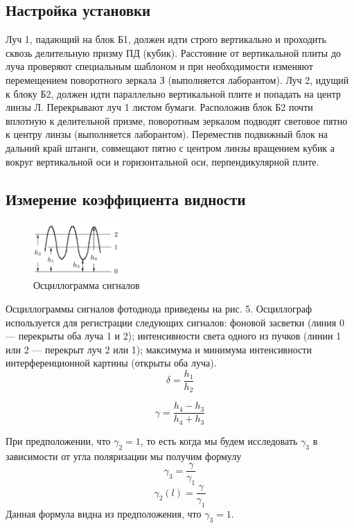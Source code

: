 \documentclass[a4paper, 12pt]{article}%
\begin{document}
\subsection*{Настройка установки}
Луч 1, падающий на блок Б1, должен идти строго вертикально и проходить сквозь делительную призму ПД (кубик). Расстояние от вертикальной плиты до луча проверяют специальным шаблоном и при необходимости изменяют перемещением поворотного зеркала З (выполняется лаборантом). Луч 2, идущий к блоку Б2, должен идти параллельно вертикальной плите и попадать на центр линзы Л. Перекрывают луч 1 листом бумаги. Расположив блок Б2 почти вплотную к делительной призме, поворотным зеркалом подводят световое пятно к центру линзы (выполняется лаборантом). Переместив подвижный блок на дальний край штанги, совмещают пятно с центром линзы вращением кубик а вокруг вертикальной оси и горизонтальной оси, перпендикулярной плите.
\subsection*{Измерение коэффициента видности}
\begin{figure}
  \begin{center}
    \includegraphics[width = 0.3\textwidth]{4.png}
  \end{center}
  \caption{Осциллограмма сигналов}
\end{figure}
Осциллограммы сигналов фотодиода приведены на рис. 5. Осциллограф используется для регистрации следующих сигналов: фоновой засветки (линия 0 --- перекрыты оба луча 1 и 2); интенсивности света одного из пучков (линии 1 или 2 --- перекрыт луч 2 или 1); максимума и минимума интенсивности интерференционной картины (открыты оба луча).
\begin{equation}
\delta = \frac{h_1}{h_2}
\end{equation}

\begin{equation}
\gamma = 	\frac{h_4 - h_3}{h_4 + h_3}
\end{equation}

При предположении, что $\gamma_2 = 1$, то есть когда мы будем исследовать $\gamma_3$ в зависимости от угла поляризации мы получим формулу
\begin{equation}
\gamma_3 = \frac{\gamma}{\gamma_1}
\end{equation}
\begin{equation}
\gamma_2(l) = \frac{\gamma}{\gamma_1}
\end{equation}
Данная формула видна из предположения, что $\gamma_3 = 1$.
\end{document}

